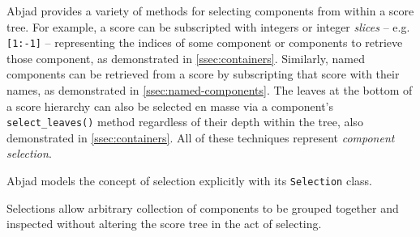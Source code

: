 Abjad provides a variety of methods for selecting components from within a
score tree. For example, a score can be subscripted with integers or integer
\emph{slices} -- e.g. \texttt{[1:-1]} -- representing the indices of some
component or components to retrieve those component, as demonstrated in
\autoref{ssec:containers}. Similarly, named components can be retrieved from a
score by subscripting that score with their names, as demonstrated in
\autoref{ssec:named-components}. The leaves at the bottom of a score hierarchy
can also be selected en masse via a component's \texttt{select\_leaves()}
method regardless of their depth within the tree, also demonstrated in
\autoref{ssec:containers}. All of these techniques represent \emph{component
selection}.

Abjad models the concept of selection explicitly with its \texttt{Selection}
class.

Selections allow arbitrary collection of components to be grouped together and
inspected without altering the score tree in the act of selecting.

\begin{comment}
<abjad>
staff = Staff("c'8 ( [ d' e' f '] g' [ a' b' c'' ) ]")
show(staff)
selection = staff[2:6]
print(format(selection))
selection.get_duration()
selection.get_timespan()
for spanner in selection.get_spanners():
    spanner

attach(Glissando(), selection)
show(staff)
</abjad>
\end{comment}

